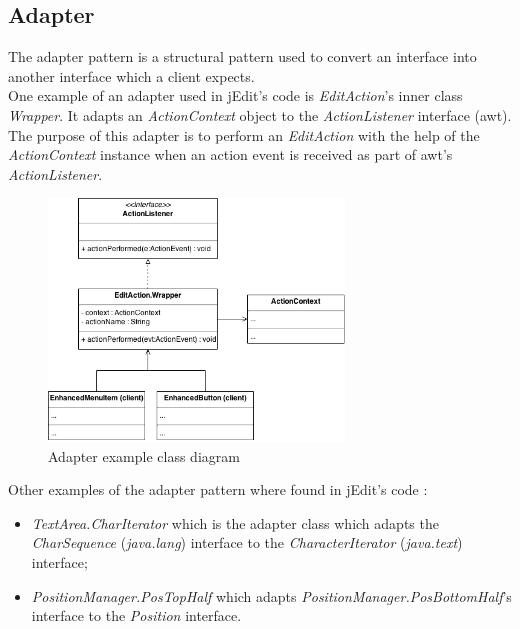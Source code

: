 \subsection{Adapter}

The adapter pattern is a structural pattern used to convert an interface into
another interface which a client expects.\\

One example of an adapter used in jEdit's code is \emph{EditAction}'s
inner class \emph{Wrapper}. It adapts an \emph{ActionContext} object to
the \emph{ActionListener} interface (awt). The purpose of this adapter
is to perform an \emph{EditAction} with the help of the
\emph{ActionContext} instance when an action event is received as part
of awt's \emph{ActionListener}.

\begin{figure}[h!]
    \includegraphics[width=0.7\textwidth]{images/adapter.png}
    \centering
    \caption{Adapter example class diagram}
\end{figure}

\begin{framehint}
    Other examples of the adapter pattern where found in jEdit's code :

    \begin{itemize}\itemsep1pt
        \item \emph{TextArea.CharIterator} which is the adapter class which
        adapts the \emph{CharSequence} (\emph{java.lang}) interface to the
        \emph{CharacterIterator} (\emph{java.text}) interface;

        \item \emph{PositionManager.PosTopHalf} which adapts
        \emph{PositionManager.PosBottomHalf}'s interface to the \emph{Position}
        interface.
    \end{itemize}
\end{framehint}

